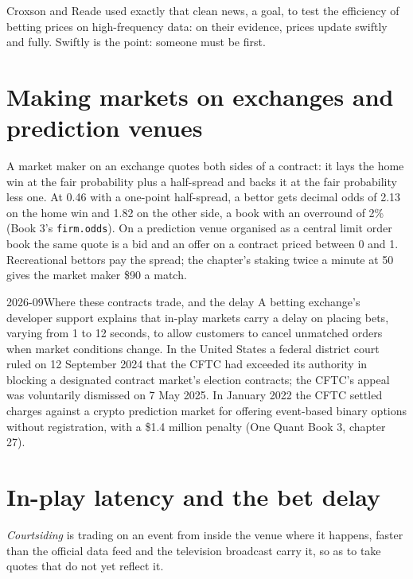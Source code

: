 Croxson and Reade used exactly that clean news, a goal, to test the efficiency of betting prices on high-frequency data: on their evidence, prices
update swiftly and fully. Swiftly is the point: someone must be first.

\section{Making markets on exchanges and prediction venues}

A market maker on an exchange quotes both sides of a contract: it lays the home win at the fair probability plus a half-spread and backs it at the
fair probability less one. At 0.46 with a one-point half-spread, a bettor gets decimal odds of 2.13 on the home win and 1.82 on the other side, a
book with an overround of 2\% (Book 3's \texttt{firm.odds}). On a prediction venue organised as a central limit order book the same quote is a bid
and an offer on a contract priced between 0 and 1. Recreational bettors pay the spread; the chapter's staking twice a minute at 50 gives the market
maker \$90 a match.

\begin{dated}{2026-09}{Where these contracts trade, and the delay}\label{dat:hf:prediction-and-sports-market-making:venues}
A betting exchange's developer support explains that in-play markets carry a delay on placing bets, varying from 1 to 12 seconds, to allow customers
to cancel unmatched orders when market conditions change. In the United States a federal district court ruled on 12 September 2024 that the CFTC had
exceeded its authority in blocking a designated contract market's election contracts; the CFTC's appeal was voluntarily dismissed on 7 May 2025.
In January 2022 the CFTC settled charges against a crypto prediction market for offering event-based binary options without registration, with a
\$1.4 million penalty (One Quant Book 3, chapter 27).
\end{dated}

\section{In-play latency and the bet delay}

\begin{definition}[Courtsiding]\label{def:hf:prediction-and-sports-market-making:courtsiding}
\emph{Courtsiding} is trading on an event from inside the venue where it happens, faster than the official data feed and the
television broadcast carry it, so as to take quotes that do not yet reflect it.
\end{definition}

